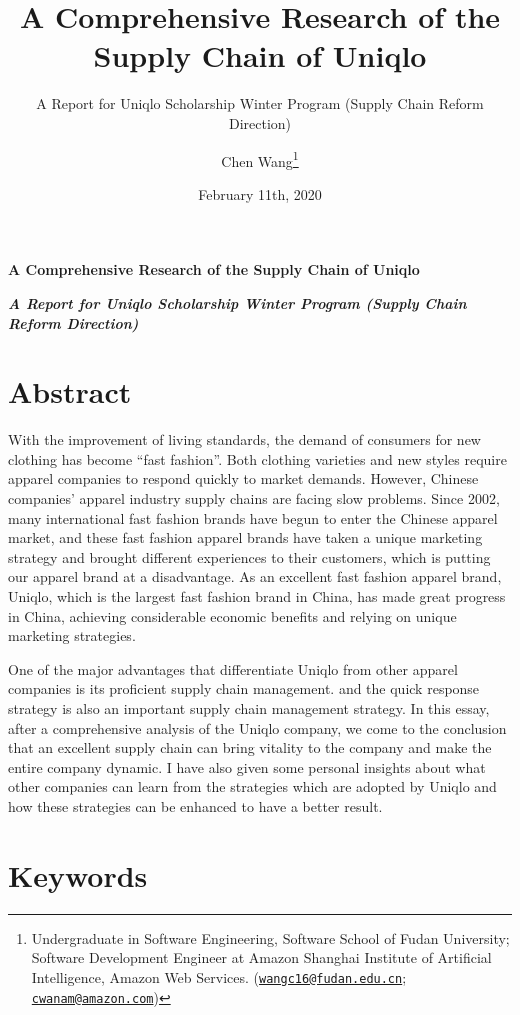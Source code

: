 \documentclass[12pt,a4paper]{article}
\title{\vspace{3in} A Comprehensive Research of the Supply Chain of Uniqlo}
\subtitle{A Report for Uniqlo Scholarship Winter Program (Supply Chain Reform
Direction)}
\author{Chen Wang\footnote{Undergraduate in Software Engineering, Software
  School of Fudan University; Software Development Engineer at Amazon
  Shanghai Institute of Artificial Intelligence, Amazon Web Services.
  (\href{mailto:wangc16@fudan.edu.cn}{\nolinkurl{wangc16@fudan.edu.cn}};
  \href{mailto:cwanam@amazon.com}{\nolinkurl{cwanam@amazon.com}})}}
\date{February 11th, 2020}
\begin{document}
\maketitle

\newpage

\LARGE

\begin{center}
\textbf{A Comprehensive Research of the Supply Chain of Uniqlo}
\end{center}

\large
\begin{center}
\textbf{\emph{A Report for Uniqlo Scholarship Winter Program (Supply Chain Reform Direction)}}
\end{center}

\hypertarget{abstract}{%
\section*{Abstract}\label{abstract}}

With the improvement of living standards, the demand of consumers for
new clothing has become ``fast fashion''. Both clothing varieties and
new styles require apparel companies to respond quickly to market
demands. However, Chinese companies' apparel industry supply chains are
facing slow problems. Since 2002, many international fast fashion brands
have begun to enter the Chinese apparel market, and these fast fashion
apparel brands have taken a unique marketing strategy and brought
different experiences to their customers, which is putting our apparel
brand at a disadvantage. As an excellent fast fashion apparel brand,
Uniqlo, which is the largest fast fashion brand in China, has made great
progress in China, achieving considerable economic benefits and relying
on unique marketing strategies.

One of the major advantages that differentiate Uniqlo from other apparel
companies is its proficient supply chain management. and the quick
response strategy is also an important supply chain management strategy.
In this essay, after a comprehensive analysis of the Uniqlo company, we
come to the conclusion that an excellent supply chain can bring vitality
to the company and make the entire company dynamic. I have also given
some personal insights about what other companies can learn from the
strategies which are adopted by Uniqlo and how these strategies can be
enhanced to have a better result.

\hypertarget{keywords}{%
\section*{Keywords}\label{keywords}}
\end{document}
